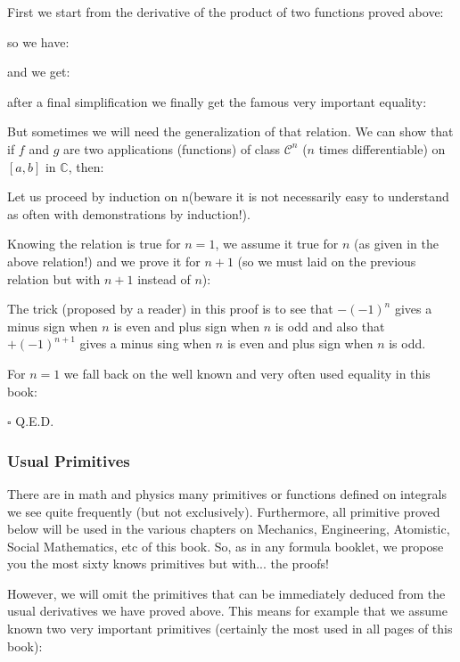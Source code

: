 	First we start from the derivative of the product of two functions proved above:
	
	
	so we have:
	
	and we get:
	
	after a final simplification we finally get the famous very important equality:
	
	But sometimes we will need the generalization of that relation. We can show that if $f$ and $g$ are two applications (functions) of class $\mathcal{C}^n$ ($n$ times differentiable) on $[a, b]$ in $\mathbb{C}$, then:
	
	\begin{dem}
	Let us proceed by induction on n$ $(beware it is not necessarily easy to understand as often with demonstrations by induction!).
	
	Knowing the relation is true for $n = 1$, we assume it true for $n$ (as given in the above relation!) and we prove it for $n + 1$ (so we must laid on the previous relation but with $n + 1$ instead of $n$):
	
	\begin{tcolorbox}[title=Remark,colframe=black,arc=10pt]
	The trick (proposed by a reader) in this proof is to see that $-(-1)^n$ gives a minus sign when $n$ is even and plus sign when $n$ is odd and also that $+(-1)^{n+1}$ gives a minus sing when $n$ is even and plus sign when $n$ is odd.
	\end{tcolorbox}
	For $n = 1$ we fall back on the well known and very often used equality in this book:
	
	\begin{flushright}
		$\square$  Q.E.D.
	\end{flushright}
	\end{dem}

	\pagebreak
	\subsubsection{Usual Primitives}
	There are in math and physics many primitives or functions defined on integrals we see  quite frequently (but not exclusively). Furthermore, all primitive proved below will be used in the various chapters on Mechanics, Engineering, Atomistic, Social Mathematics, etc of this book. So, as in any formula booklet, we propose you the most sixty knows primitives but with... the proofs!
	
	However, we will omit the primitives that can be immediately deduced from the usual derivatives we have proved above. This means for example that we assume  known two very important primitives (certainly the most used in all pages of this book):
		
